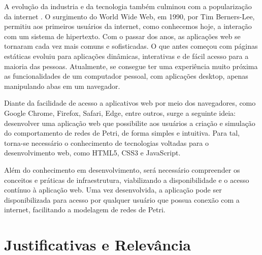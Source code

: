 \documentclass[
	12pt,				%
	openright,			%
	oneside,			%
	a4paper,			%
	english,			%
	brazil				%
	]{abntex2}
\begin{document}
A evolução da industria e da tecnologia também culminou com a popularização da internet \cite{lins2013evoluccao}. O surgimento do World Wide Web, em 1990, por Tim Berners-Lee, permitiu aos primeiros usuários da internet, como conhecemos hoje, a interação com um sistema de hipertexto. Com o passar dos anos, as aplicações web se tornaram cada vez mais comuns e sofisticadas. O que antes começou com páginas estáticas evoluiu para aplicações dinâmicas, interativas e de fácil acesso para a maioria das pessoas. Atualmente, se consegue ter uma experiência muito próxima as funcionalidades de um computador pessoal, com aplicações desktop, apenas manipulando abas em um navegador.

Diante da facilidade de acesso a aplicativos web por meio dos navegadores, como Google Chrome, Firefox, Safari, Edge, entre outros, surge a seguinte ideia: desenvolver uma aplicação web que possibilite aos usuários a criação e simulação do comportamento de redes de Petri, de forma simples e intuitiva. Para tal, torna-se necessário o conhecimento de tecnologias voltadas para o desenvolvimento web, como HTML5, CSS3 e JavaScript.

Além do conhecimento em desenvolvimento, será necessário  compreender os conceitos e práticas de infraestrutura, viabilizando a disponibilidade e o acesso contínuo à aplicação web. Uma vez desenvolvida, a aplicação pode ser disponibilizada para acesso por qualquer usuário que possua conexão com a internet, facilitando a modelagem de redes de Petri.




\section{Justificativas e Relevância}
\end{document}
